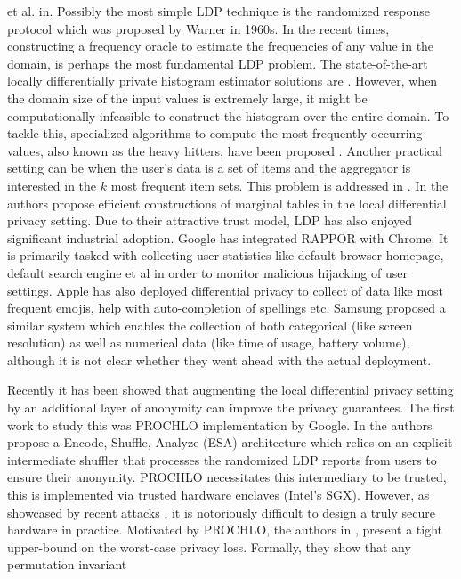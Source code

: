 et al. in\cite{Kasivi}. Possibly the most simple \textsf{LDP} technique is the randomized response \cite{RR} protocol which was proposed by Warner in 1960s.  In the recent times, constructing a frequency oracle to estimate the frequencies of any value in the domain, is perhaps the most fundamental \textsf{LDP} problem. The state-of-the-art locally differentially private histogram estimator solutions are \cite{LDP1, LDP2, Rappor1}.  However, when the domain size of the input values is extremely large, it might be computationally infeasible to construct the histogram over the entire domain. To tackle this, specialized algorithms to compute the most frequently occurring values, also known as the heavy hitters, have been proposed \cite{HH,Rappor2,HH2}. Another practical setting can be when the user's data is a set of items and the aggregator is interested in  the $k$ most frequent item sets. This problem is addressed in \cite{15,itemset}. In \cite{Cormode, CALM} the authors propose efficient constructions of marginal tables in the local differential privacy setting. Due to their attractive trust model, \textsf{LDP} has also enjoyed significant industrial adoption.  Google has integrated RAPPOR \cite{Rappor1, Rappor2} with Chrome. It is primarily tasked with collecting user statistics like default browser homepage, default search engine et al in order to monitor malicious hijacking of user settings. Apple \cite{Apple} has also deployed differential privacy to collect of data like most frequent emojis, help with auto-completion of spellings etc.  Samsung \cite{Samsung} proposed a similar system 
which enables the collection of both categorical 
(like screen resolution) as well as numerical data (like
time of usage, battery volume), although it is not clear
whether they went ahead with the actual deployment. \par
Recently it has been showed that augmenting the local differential privacy setting by an additional layer of anonymity can improve the privacy
guarantees. The first work to study this was PROCHLO \cite{Prochlo} implementation by Google. In \cite{Prochlo} the authors propose a  Encode, Shuffle, Analyze (ESA) architecture
 which relies on an explicit intermediate shuffler that processes the randomized LDP reports
from users to ensure their anonymity. PROCHLO necessitates  this intermediary to be trusted, this is implemented via trusted hardware enclaves (Intel's SGX). However, as showcased by recent attacks \cite{Foreshadow}, it is notoriously difficult to design a  truly secure hardware in practice. Motivated by PROCHLO, the authors in \cite{amplification}, present a tight upper-bound on the worst-case privacy loss. Formally, they show that  any permutation invariant
